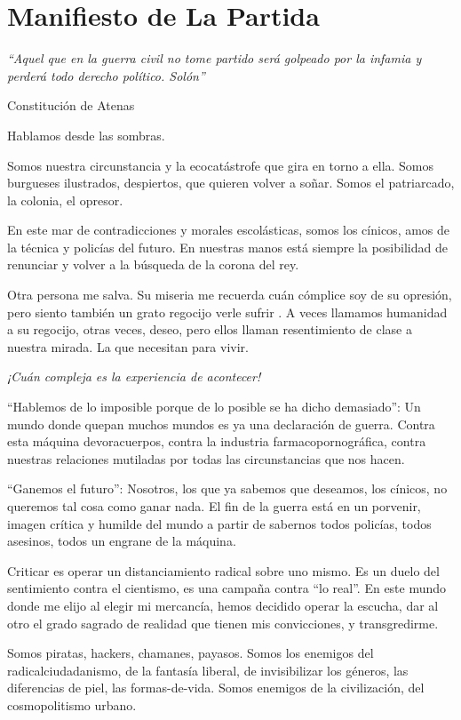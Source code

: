 \hypertarget{manifiesto-de-la-partida}{%
\section{Manifiesto de La Partida}\label{manifiesto-de-la-partida}}

\emph{``Aquel que en la guerra civil\emph{ }no tome partido será
golpeado\emph{ }por la infamia y perderá\emph{ }todo derecho político.
Solón''}

Constitución de Atenas

Hablamos desde las sombras.

Somos nuestra circunstancia y la ecocatástrofe que gira en torno a ella.
Somos burgueses ilustrados, despiertos, que quieren volver a soñar.
Somos el patriarcado, la colonia, el opresor.

En este mar de contradicciones y morales escolásticas, somos los
cínicos, amos de la técnica y policías del futuro. En nuestras manos
está siempre la posibilidad de renunciar y volver a la búsqueda de la
corona del rey.

Otra persona me salva. Su miseria me recuerda cuán cómplice soy de su
opresión, pero siento también un grato regocijo verle sufrir
\cite{Wikipedia2023}. A veces llamamos humanidad a su regocijo, otras
veces, deseo, pero ellos llaman resentimiento de clase a nuestra mirada.
La que necesitan para vivir.

\emph{¡Cuán compleja es la experiencia de acontecer!}

``Hablemos de lo imposible porque de lo posible se ha dicho demasiado'':
Un mundo donde quepan muchos mundos es ya una declaración de guerra.
Contra esta máquina devoracuerpos, contra la industria
farmacopornográfica, contra nuestras relaciones mutiladas por todas las
circunstancias que nos hacen.

``Ganemos el futuro'': Nosotros, los que ya sabemos que deseamos, los
cínicos, no queremos tal cosa como ganar nada. El fin de la guerra está
en un porvenir, imagen crítica y humilde del mundo a partir de sabernos
todos policías, todos asesinos, todos un engrane de la máquina.

Criticar es operar un distanciamiento radical sobre uno mismo. Es un
duelo del sentimiento contra el cientismo, es una campaña contra ``lo
real''. En este mundo donde me elijo al elegir mi mercancía, hemos
decidido operar la escucha, dar al otro el grado sagrado de realidad que
tienen mis convicciones, y transgredirme.

Somos piratas, hackers, chamanes, payasos. Somos los enemigos del
radicalciudadanismo, de la fantasía liberal, de invisibilizar los
géneros, las diferencias de piel, las formas-de-vida. Somos enemigos de
la civilización, del cosmopolitismo urbano.

